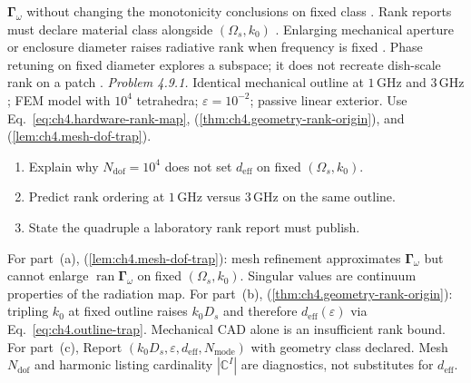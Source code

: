 \(\boldsymbol{\Gamma}_\omega\) without changing the monotonicity conclusions on fixed class \cite{stratton1941}.
Rank reports must declare material class alongside \((\Omega_{s},k_{0})\) \cite{harrington2001}.
Enlarging mechanical aperture or enclosure diameter raises radiative rank when frequency is fixed \cite{stratton1941}. Phase retuning on fixed diameter explores a subspace; it does not recreate dish-scale rank on a patch \cite{hansen1988}.
\emph{Problem 4.9.1.} Identical mechanical outline at $1\,\mathrm{GHz}$ and $3\,\mathrm{GHz}$; FEM model with $10^{4}$ tetrahedra; $\varepsilon=10^{-2}$; passive linear exterior. Use Eq.~\eqref{eq:ch4.hardware-rank-map}, (\ref{thm:ch4.geometry-rank-origin}), and (\ref{lem:ch4.mesh-dof-trap}).
\begin{enumerate}
\item[(a)] Explain why $N_{\mathrm{dof}}=10^{4}$ does not set $d_{\mathrm{eff}}$ on fixed $(\Omega_{s},k_{0})$.
\item[(b)] Predict rank ordering at $1\,\mathrm{GHz}$ versus $3\,\mathrm{GHz}$ on the same outline.
\item[(c)] State the quadruple a laboratory rank report must publish.
\end{enumerate}
For part~(a), (\ref{lem:ch4.mesh-dof-trap}): mesh refinement approximates $\boldsymbol{\Gamma}_\omega$ but cannot enlarge $\operatorname{ran}\boldsymbol{\Gamma}_\omega$ on fixed $(\Omega_{s},k_{0})$. Singular values are continuum properties of the radiation map.
For part~(b), (\ref{thm:ch4.geometry-rank-origin}): tripling $k_{0}$ at fixed outline raises $k_{0}D_{s}$ and therefore $d_{\mathrm{eff}}(\varepsilon)$ via Eq.~\eqref{eq:ch4.outline-trap}. Mechanical CAD alone is an insufficient rank bound.
For part~(c), Report $(k_{0}D_{s},\varepsilon,d_{\mathrm{eff}},N_{\mathrm{mode}})$ with geometry class declared. Mesh $N_{\mathrm{dof}}$ and harmonic listing cardinality $|\mathbb{C}^{I}|$ are diagnostics, not substitutes for $d_{\mathrm{eff}}$.
